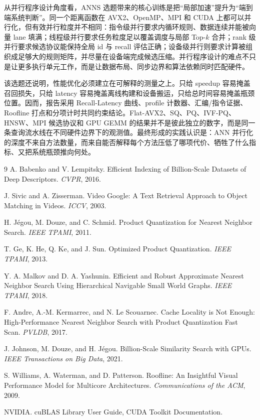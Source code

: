 \documentclass[a4paper,11pt,UTF8]{ctexart}
\begin{document}
从并行程序设计角度看，ANNS 选题带来的核心训练是把“局部加速”提升为“端到端系统判断”。同一个距离函数在 AVX2、OpenMP、MPI 和 CUDA 上都可以并行化，但有效并行粒度并不相同：指令级并行要求内循环规则、数据连续并能被向量 lane 填满；线程级并行要求任务粒度足以覆盖调度与局部 Top-$k$ 合并；rank 级并行要求候选协议能保持全局 id 与 recall 评估正确；设备级并行则要求计算被组织成足够大的规则矩阵，并尽量在设备端完成候选压缩。并行程序设计的难点不只是让更多执行单元工作，而是让数据布局、同步边界和算法依赖同时匹配硬件。

该选题还说明，性能优化必须建立在可解释的测量之上。只给 speedup 容易掩盖召回损失，只给 latency 容易掩盖离线构建和设备搬运，只给总时间容易掩盖瓶颈位置。因而，报告采用 Recall-Latency 曲线、profile 计数器、汇编/指令证据、Roofline 打点和分项计时共同约束结论。Flat-AVX2、SQ、PQ、IVF-PQ、HNSW、MPI 候选协议和 GPU GEMM 的结果并不是彼此独立的数字，而是同一条查询流水线在不同硬件边界下的观测值。最终形成的实践认识是：ANN 并行化的深度不来自方法数量，而来自能否解释每个方法压低了哪项代价、牺牲了什么指标、又把系统瓶颈推向何处。

\begin{thebibliography}{9}
A. Babenko and V. Lempitsky. Efficient Indexing of Billion-Scale Datasets of Deep Descriptors. \emph{CVPR}, 2016.

J. Sivic and A. Zisserman. Video Google: A Text Retrieval Approach to Object Matching in Videos. \emph{ICCV}, 2003.

H. J\'egou, M. Douze, and C. Schmid. Product Quantization for Nearest Neighbor Search. \emph{IEEE TPAMI}, 2011.

T. Ge, K. He, Q. Ke, and J. Sun. Optimized Product Quantization. \emph{IEEE TPAMI}, 2013.

Y. A. Malkov and D. A. Yashunin. Efficient and Robust Approximate Nearest Neighbor Search Using Hierarchical Navigable Small World Graphs. \emph{IEEE TPAMI}, 2018.

F. Andre, A.-M. Kermarrec, and N. Le Scouarnec. Cache Locality is Not Enough: High-Performance Nearest Neighbor Search with Product Quantization Fast Scan. \emph{PVLDB}, 2017.

J. Johnson, M. Douze, and H. J\'egou. Billion-Scale Similarity Search with GPUs. \emph{IEEE Transactions on Big Data}, 2021.

S. Williams, A. Waterman, and D. Patterson. Roofline: An Insightful Visual Performance Model for Multicore Architectures. \emph{Communications of the ACM}, 2009.

NVIDIA. cuBLAS Library User Guide, CUDA Toolkit Documentation.
\end{thebibliography}
\end{document}
